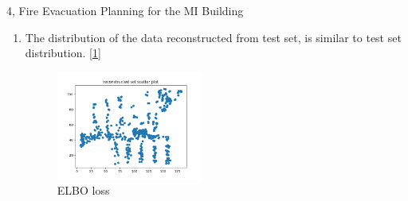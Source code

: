\documentclass[10pt,a4paper]{article}
\begin{document}
\begin{task}{4, Fire Evacuation Planning for the MI Building}
\begin{enumerate}
	\item The distribution of the data reconstructed from test set, is similar to test set distribution. [\ref{fig:reconstructed-data}]
	\begin{figure}[H]
		\caption{ELBO loss}
		\label{fig:reconstructed-data}
		\centering
		\includegraphics[width=0.45\textwidth]{../plots/task4/reconstructed_set_scatter.png}
	\end{figure}
\end{enumerate}
\end{task}
\end{document}
